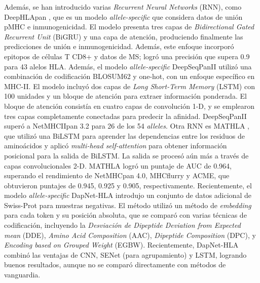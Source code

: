Además, se han introducido varias \textit{Recurrent Neural Networks} (RNN), como DeepHLApan \citep{wu2019deephlapan}, que es un modelo \textit{allele-specific} que considera datos de unión pMHC e inmunogenicidad. El modelo presenta tres capas de \textit{Bidirectional Gated Recurrent Unit} (BiGRU) y una capa de atención, produciendo finalmente las predicciones de unión e inmunogenicidad. Además, este enfoque incorporó epitopos de células T CD8+ y datos de MS; logró una precisión que supera 0.9 para 43 alelos HLA. Además, el modelo \textit{allele-specific} DeepSeqPanII \citep{liu2021deepseqpanii} utilizó una combinación de codificación BLOSUM62 y one-hot, con un enfoque específico en MHC-II. El modelo incluyó dos capas de \textit{Long Short-Term Memory} (LSTM) con 100 unidades y un bloque de atención para extraer información ponderada. El bloque de atención consistía en cuatro capas de convolución 1-D, y se emplearon tres capas completamente conectadas para predecir la afinidad. DeepSeqPanII superó a NetMHCIIpan 3.2 para 26 de los 54 \textit{alleles}. Otra RNN es MATHLA \citep{ye2021mathla}, que utilizó una BiLSTM para aprender las dependencias entre los residuos de aminoácidos y aplicó \textit{multi-head self-attention} para obtener información posicional para la salida de BiLSTM. La salida se procesó aún más a través de capas convolucionales 2-D. MATHLA logró un puntaje de AUC de 0.964, superando el rendimiento de NetMHCpan 4.0, MHCflurry y ACME, que obtuvieron puntajes de 0.945, 0.925 y 0.905, respectivamente. Recientemente, el modelo \textit{allele-specific} DapNet-HLA \citep{jing2023dapnet} introdujo un conjunto de datos adicional de Swiss-Prot para muestras negativas. El método utilizó un método de \textit{embedding} para cada token y su posición absoluta, que se comparó con varias técnicas de codificación, incluyendo la \textit{Desviación de Dipeptide Deviation from Expected mean} (DDE), \textit{Amino Acid Composition} (AAC), \textit{Dipeptide Composition} (DPC), y \textit{Encoding based on Grouped Weight} (EGBW). Recientemente, DapNet-HLA combinó las ventajas de CNN, SENet (para agrupamiento) y LSTM, logrando buenos resultados, aunque no se comparó directamente con métodos de vanguardia.


